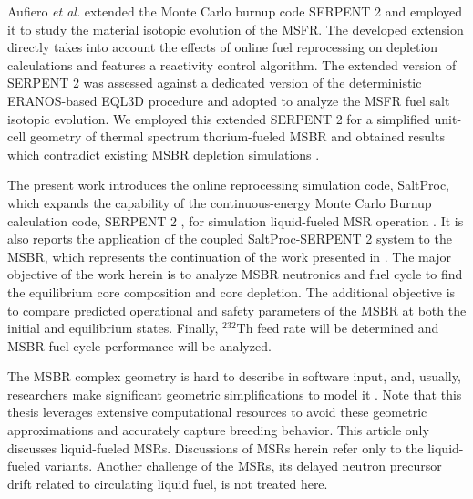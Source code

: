 Aufiero \emph{et al.} extended the Monte Carlo burnup code SERPENT 2 and employed it to study the material isotopic evolution of the \gls{MSFR}. The developed extension directly takes into account the effects of online fuel reprocessing on depletion calculations and features a reactivity control algorithm. The extended version of SERPENT 2 was assessed against a dedicated version of the deterministic ERANOS-based EQL3D procedure \cite{ruggieri_eranos_2006} and adopted to analyze the \gls{MSFR} fuel salt isotopic evolution. We employed this extended SERPENT 2 for a simplified unit-cell geometry of thermal spectrum thorium-fueled \gls{MSBR} and obtained results which contradict existing \gls{MSBR} depletion simulations \cite{jeong_equilibrium_2016}.

The present work introduces the online reprocessing simulation code, SaltProc, which expands the capability of the continuous-energy Monte Carlo Burnup calculation code, SERPENT 2 \cite{leppanen_serpent_2015}, for simulation liquid-fueled \gls{MSR} operation \cite{andrei_rykhlevskii_arfc/saltproc:_2018}. It is also reports the application of the coupled SaltProc-SERPENT 2 system to the \gls{MSBR}, which represents the continuation of the work presented in \cite{rykhlevskii_full-core_2017, rykhlevskii_online_2017}. The major objective of the work herein is to analyze \gls{MSBR} neutronics and fuel cycle to find the equilibrium core composition and core depletion. The additional objective is to compare predicted operational and safety parameters of the \gls{MSBR} at both the initial and equilibrium states. Finally, $^{232}$Th feed rate will be determined and \gls{MSBR} fuel cycle performance will be analyzed.

The \gls{MSBR} complex geometry is hard to describe in software input, and, usually, researchers make significant geometric simplifications to model it \cite{park_whole_2015}. Note that this thesis leverages extensive computational resources to avoid these geometric approximations and accurately capture breeding behavior. This article only discusses liquid-fueled \glspl{MSR}. Discussions of \glspl{MSR} herein refer only to the liquid-fueled variants. Another challenge of the \glspl{MSR}, its delayed neutron precursor drift related to circulating liquid fuel, is not treated here.